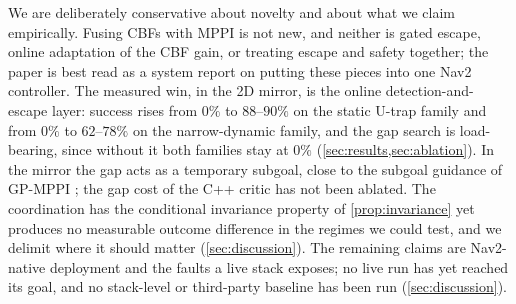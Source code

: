 We are deliberately conservative about novelty and about what we claim empirically. Fusing CBFs with MPPI is not new, and neither is gated escape, online adaptation of the CBF gain, or treating escape and safety together; the paper is best read as a system report on putting these pieces into one Nav2 controller. The measured win, in the 2D mirror, is the online detection-and-escape layer: success rises from $0\%$ to $88$--$90\%$ on the static U-trap family and from $0\%$ to $62$--$78\%$ on the narrow-dynamic family, and the gap search is load-bearing, since without it both families stay at $0\%$ (\cref{sec:results,sec:ablation}). In the mirror the gap acts as a temporary subgoal, close to the subgoal guidance of GP-MPPI \citep{gp_mppi}; the gap cost of the C++ critic has not been ablated. The coordination has the conditional invariance property of \cref{prop:invariance} yet produces no measurable outcome difference in the regimes we could test, and we delimit where it should matter (\cref{sec:discussion}). The remaining claims are Nav2-native deployment and the faults a live stack exposes; no live run has yet reached its goal, and no stack-level or third-party baseline has been run (\cref{sec:discussion}).
